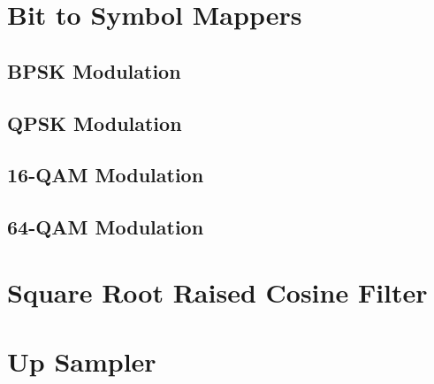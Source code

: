 \documentclass[]{article}
\begin{document}
\section{Bit to Symbol Mappers}
\label{app:bittosym}
\subsection{BPSK Modulation }
\label{app:bpsk_mod}
%


\cleardoublepage  %
\newpage

\subsection{QPSK Modulation}
\label{app:qpsk_mod}

\cleardoublepage  %
\newpage

\subsection{16-QAM Modulation}
\label{app:qam_16_mod}


\cleardoublepage  %
\newpage

\subsection{64-QAM Modulation }
\label{app:qam_64_mod}

\cleardoublepage  %
\newpage

\section{Square Root Raised Cosine Filter}
\label{app:sqrt_raised_cosine}

\cleardoublepage
\newpage

\section{Up Sampler}
\label{app:impulse_train}

\cleardoublepage
\newpage
\end{document}
